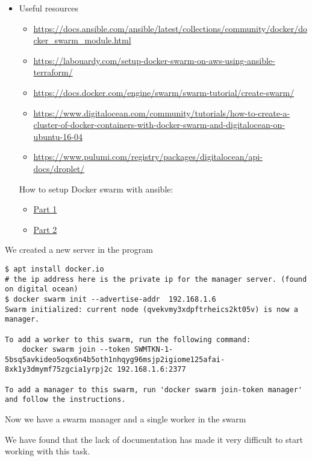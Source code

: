 \begin{itemize}
    \item Useful resources
    \begin{itemize}
        \item \url{https://docs.ansible.com/ansible/latest/collections/community/docker/docker_swarm_module.html}
        \item \url{https://labouardy.com/setup-docker-swarm-on-aws-using-ansible-terraform/}
        \item \url{https://docs.docker.com/engine/swarm/swarm-tutorial/create-swarm/}
        \item \url{https://www.digitalocean.com/community/tutorials/how-to-create-a-cluster-of-docker-containers-with-docker-swarm-and-digitalocean-on-ubuntu-16-04}
        \item \url{https://www.pulumi.com/registry/packages/digitalocean/api-docs/droplet/}
    \end{itemize}

    How to setup Docker swarm with ansible:

    \begin{itemize}
        \item \href{https://www.youtube.com/watch?v=xZx9XoBnAUI}{Part 1}
        \item \href{https://www.youtube.com/watch?v=qVGO5_bKmpE\&list=PLWZKNB9waqIXEL-NIapWwIADPtkspe9vk\&index=47\&t=201s}{Part 2}
    \end{itemize}
\end{itemize}

We created a new server in the program
\begin{verbatim}
$ apt install docker.io
# the ip address here is the private ip for the manager server. (found on digital ocean)
$ docker swarm init --advertise-addr  192.168.1.6
Swarm initialized: current node (qvekvmy3xdpftrheics2kt05v) is now a manager.

To add a worker to this swarm, run the following command:
    docker swarm join --token SWMTKN-1-5bsq5avkideo5oqx6n4b5oth1nhqyg96msjp2igiome125afai-8xk1y3dmymf75zgcia1yrpj2c 192.168.1.6:2377

To add a manager to this swarm, run 'docker swarm join-token manager' and follow the instructions.
\end{verbatim}

Now we have a swarm manager and a single worker in the swarm

We have found that the lack of documentation has made it very difficult to start working with this task.

